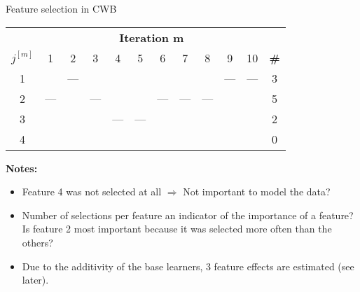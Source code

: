 \begin{vbframe}{Feature selection in CWB}

\begin{table}
  \centering
  \scriptsize
    \begin{tabular}{c|cccccccccc|c}
    \multicolumn{1}{c|}{} & \multicolumn{10}{c}{\bfseries Iteration m} \\ 
    $j^{[m]}$ & 1 & 2 & 3 & 4 & 5 & 6 & 7 & 8 & 9 & 10  & {\bfseries \#} \\ \hline\hline
    1 &     & --- &     &     &     &     &     &     & --- & --- & 3\\
    2 & --- &     & --- &     &     & --- & --- & --- &     &     & 5\\
    3 &     &     &     & --- & --- &     &     &     &     &     & 2\\
    4 &     &     &     &     &     &     &     &     &     &     & 0 
    \end{tabular}
    \addtocounter{framenumber}{-1}
\end{table}

\textbf{Notes:} 
\begin{itemize}
    \item 
        Feature 4 was not selected at all $\Rightarrow$ Not important to model the data?

    \item
        Number of selections per feature an indicator of the importance of a feature? Is feature 2 most important because it was selected more often than the others?

    \item 
        Due to the additivity of the base learners, 3 feature effects are estimated (see later).
\end{itemize}

\end{vbframe}